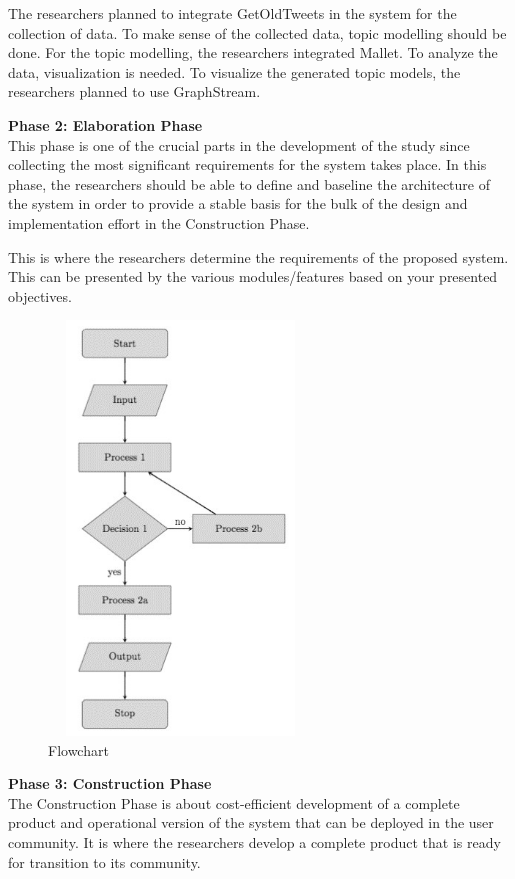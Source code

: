 The researchers planned to integrate GetOldTweets in the system for the collection of data. To make sense of the collected data, topic modelling should be done. For the topic modelling, the researchers integrated Mallet. To analyze the data, visualization is needed. To visualize the generated topic models, the researchers planned to use GraphStream.
	

\noindent\textbf{Phase 2: Elaboration Phase}\\
\hspace*{1.5cm}This phase is one of the crucial parts in the development of the study since collecting the most significant requirements for the system takes place. In this phase, the researchers should be able to define and baseline the architecture of the system in order to provide a stable basis for the bulk of the design and implementation effort in the Construction Phase. 

This is where the researchers determine the requirements of the proposed system. This can be presented by the various modules/features based on your presented objectives.

\begin{figure}[H]
	\centering
	\caption{Flowchart}
	\includegraphics[width=7cm,height=11cm]{image/cs_flowchart.jpg}
\end{figure}


\noindent\textbf{Phase 3: Construction Phase}\\
\hspace*{1.5cm}The Construction Phase is about cost-efficient development of a complete product and operational version of the system that can be deployed in the user community. It is where the researchers develop a complete product that is ready for transition to its community. 
	
